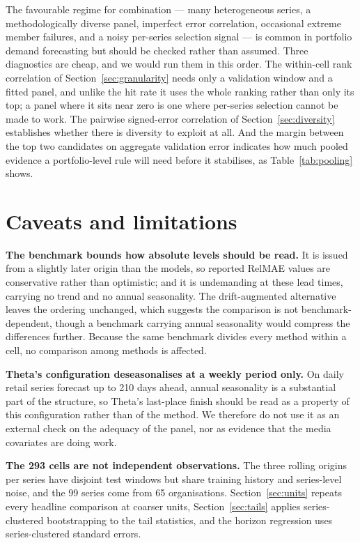 \documentclass[11pt]{article}
\begin{document}
The favourable regime for combination --- many heterogeneous series, a methodologically diverse panel, imperfect error correlation, occasional extreme member failures, and a noisy per-series selection signal --- is common in portfolio demand forecasting but should be checked rather than assumed. Three diagnostics are cheap, and we would run them in this order. The within-cell rank correlation of Section~\ref{sec:granularity} needs only a validation window and a fitted panel, and unlike the hit rate it uses the whole ranking rather than only its top; a panel where it sits near zero is one where per-series selection cannot be made to work. The pairwise signed-error correlation of Section~\ref{sec:diversity} establishes whether there is diversity to exploit at all. And the margin between the top two candidates on aggregate validation error indicates how much pooled evidence a portfolio-level rule will need before it stabilises, as Table~\ref{tab:pooling} shows.

\section{Caveats and limitations}
\label{sec:caveats}

\textbf{The benchmark bounds how absolute levels should be read.} It is issued from a slightly later origin than the models, so reported RelMAE values are conservative rather than optimistic; and it is undemanding at these lead times, carrying no trend and no annual seasonality. The drift-augmented alternative leaves the ordering unchanged, which suggests the comparison is not benchmark-dependent, though a benchmark carrying annual seasonality would compress the differences further. Because the same benchmark divides every method within a cell, no comparison among methods is affected.

\textbf{Theta's configuration deseasonalises at a weekly period only.} On daily retail series forecast up to 210 days ahead, annual seasonality is a substantial part of the structure, so Theta's last-place finish should be read as a property of this configuration rather than of the method. We therefore do not use it as an external check on the adequacy of the panel, nor as evidence that the media covariates are doing work.

\textbf{The 293 cells are not independent observations.} The three rolling origins per series have disjoint test windows but share training history and series-level noise, and the 99 series come from 65 organisations. Section~\ref{sec:units} repeats every headline comparison at coarser units, Section~\ref{sec:tails} applies series-clustered bootstrapping to the tail statistics, and the horizon regression uses series-clustered standard errors.
\end{document}
